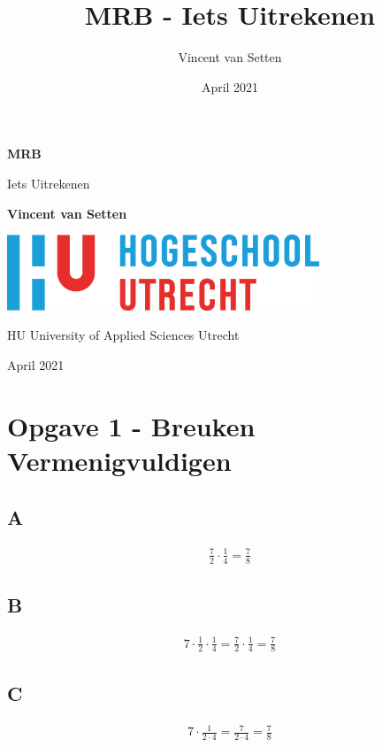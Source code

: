 \documentclass[fleqn]{article}
\title{MRB - Iets Uitrekenen}
\author{Vincent van Setten }
\date{April 2021}
\begin{document}
\begin{titlepage}
   \begin{center}
       \vspace*{1cm}
        \Large
       \textbf{MRB}

       \vspace{0.5cm}
        Iets Uitrekenen
            
       \vspace{1.5cm}

       \textbf{Vincent van Setten}

       \vfill
      \includegraphics[width=0.7\textwidth]{hu.png}
       \vfill

       HU University of Applied Sciences Utrecht
            
       \vspace{0.8cm}

       April 2021
            
   \end{center}
\end{titlepage}

\section{Opgave 1 - Breuken Vermenigvuldigen}

\subsection{A}
\begin{align*}
    \frac{7}{2} \cdot \frac{1}{4} = \frac{7}{8}
\end{align*}

\subsection{B}
\begin{align*}
    7 \cdot \frac{1}{2} \cdot \frac{1}{4} = \frac{7}{2} \cdot \frac{1}{4} = \frac{7}{8}
\end{align*}

\subsection{C}
\begin{align*}
    7 \cdot \frac{1}{2 \cdot 4} = \frac{7}{2 \cdot 4} = \frac{7}{8}
\end{align*}
\end{document}
